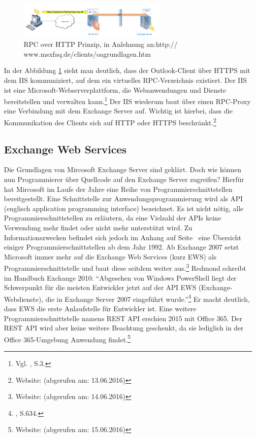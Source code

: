 \begin{figure}[h!]
\centering
\includegraphics[width=0.65\textwidth]{Abbildungen/RPC_HTTP.png}
	\caption[RPC over HTTP Prinzip]{RPC over HTTP Prinzip,  in Anlehnung an:http://
	www.msxfaq.de/clients/oagrundlagen.htm}
	\label{fig:RPC_HTTP}
\end{figure}

\noindent
In der Abbildung \ref{fig:RPC_HTTP} sieht man deutlich, dass der Outlook-Client über HTTPS mit dem IIS kommuniziert, auf dem ein virtuelles RPC-Verzeichnis existiert. Der IIS ist eine Microsoft-Webserverplattform, die Webanwendungen und Dienste bereitstellen und verwalten kann.\footnote{Vgl. \citeauthor{Volodarsky} \citeyear{Volodarsky}, S.3.} Der IIS wiederum baut über einen RPC-Proxy eine Verbindung mit dem Exchange Server auf. Wichtig ist hierbei, dass die Kommunikation des Clients sich auf HTTP oder HTTPS beschränkt.\footnote{Website:  \citeauthor{MSXoutlook} (abgerufen am: 13.06.2016)}


\subsection{Exchange Web Services}
\noindent
Die Grundlagen von Mircosoft Exchange Server sind geklärt. Doch wie können nun Programmierer über Quellcode auf den Exchange Server zugreifen? Hierfür hat Mircosoft im Laufe der Jahre eine Reihe von Programmierschnittstellen bereitgestellt. Eine Schnittstelle zur Anwendungsprogrammierung wird als API (englisch application programming interface) bezeichnet. Es ist nicht nötig, alle Programmierschnittstellen zu erläutern, da eine Vielzahl der APIs keine Verwendung mehr findet oder nicht mehr unterstützt wird. Zu Informationszwecken befindet sich jedoch im Anhang auf Seite~\pageref{API_Geschichte} eine Übersicht einiger Programmierschnittstellen ab dem Jahr 1992. Ab Exchange 2007 setzt Microsoft immer mehr auf die Exchange Web Services (kurz EWS) als Programmierschnittstelle und baut diese seitdem weiter aus.\footnote{Website: \citeauthor{MSXews} (abgerufen am: 14.06.2016)}
Redmond schreibt im Handbuch Exchange 2010: 
\enquote{Abgesehen von Windows PowerShell liegt der Schwerpunkt für die meisten Entwickler jetzt auf der API EWS (Exchange-Webdienste), die in Exchange Server 2007 eingeführt wurde.}\footnote{\citeauthor{Redmond} \citeyear{Redmond}, S.634.}
Er macht deutlich, dass EWS die erste Anlaufstelle für Entwickler ist. Eine weitere Programmierschnittstelle namens REST API erschien 2015 mit Office 365. Der REST API wird aber keine weitere Beachtung geschenkt, da sie lediglich in der Office 365-Umgebung Anwendung findet.\footnote{Website: \citeauthor{MicrosoftAPI} (abgerufen am: 15.06.2016)}


